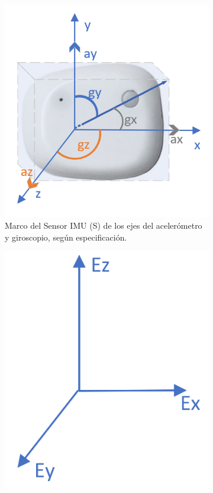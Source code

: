 \begin{figure}[H]
\centering
\begin{subfigure}[b]{0.5\textwidth}
  \centering
  \includegraphics[width=\textwidth]{TESIS/imagenes/chap05/sensor-frame.PNG}
  \caption{Marco del Sensor IMU (S) de los ejes del acelerómetro y giroscopio, según especificación.}
  \label{fig:sfig1}
\end{subfigure}%
\begin{subfigure}[b]{0.5\textwidth}
  \centering
  \includegraphics[width=\textwidth]{TESIS/imagenes/chap05/frame-earth.PNG}

\end{subfigure}
\end{figure}
